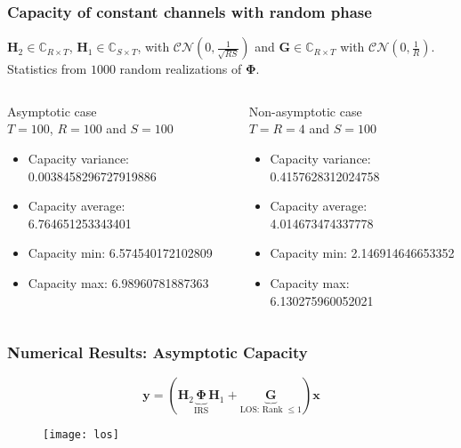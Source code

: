\documentclass[10pt,tgadventor, onlymath]{beamer}
\begin{document}
\begin{frame}
	\frametitle{Capacity of constant channels with random phase
	}
	\centering 
	$\mathbf{H}_{2} \in \mathbb{C}_{R \times T}$, 
	$\mathbf{H}_{1} \in \mathbb{C}_{S \times T}$, with $\mathcal{CN}(0,\frac{1}{\sqrt{RS}})$
	and $ \mathbf{G} \in \mathbb{C}_{R \times T}$ with $\mathcal{CN}(0,\frac{1}{R})$. 
	Statistics from $1000$ random realizations of $\boldsymbol{\Phi}$.
	\bigskip
	
\begin{columns}
\begin{column}{0.5\linewidth}
\centering
Asymptotic case \\ $T = 100$, $ R = 100$ and $S = 100$
\begin{itemize}
\item
Capacity variance:
 0.0038458296727919886
 \item
Capacity average:
 6.764651253343401
 \item
Capacity min:
 6.574540172102809
 \item
Capacity max:
 6.98960781887363
\end{itemize}
\end{column}
\begin{column}{0.5\linewidth}
\centering
Non-asymptotic case\\ $T = R = 4$ and $S = 100$
\begin{itemize}
\item
Capacity variance:
 0.4157628312024758
 \item
Capacity average:
 4.014673474337778
 \item
Capacity min:
 2.146914646653352
 \item
Capacity max:
 6.130275960052021
\end{itemize}
\end{column}
\end{columns}
\end{frame}

\begin{frame}
	\frametitle{Numerical Results: Asymptotic Capacity}
	
	\begin{equation*}
	\mathbf{y} = (\mathbf{H}_2\underbrace{\boldsymbol{\Phi}}_{\text{IRS}}\mathbf{H}_1 + \underbrace{\mathbf{G}}_{\text{LOS: Rank $\leq 1$}})\mathbf{x}
	\end{equation*} 
\begin{figure}
\texttt{[image: los]}
\end{figure}
\end{frame}
\end{document}

